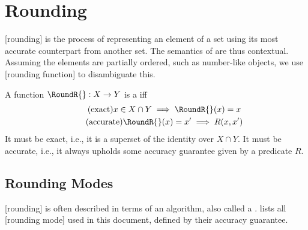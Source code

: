 \section{Rounding}

[rounding] is the process of representing an element of a set using its most accurate counterpart from another set.
The semantics of  are thus contextual.
Assuming the elements are partially ordered, such as number-like objects, we use [rounding function] to disambiguate this.

\begin{definition}
    A function \(\RoundR{} : X \to Y\) is a  iff
    \begin{gather*}
        \label{eq:exact}
        \tag{exact}
        x \in X \cap Y \implies \RoundR{}(x) = x \\
        \label{eq:accurate}
        \tag{accurate}
        \RoundR{}(x) = x^\prime \implies R(x,x^\prime)
    \end{gather*}
    It must be exact, i.e., it is a superset of the identity over \(X \cap Y\).
    It must be accurate, i.e., it always upholds some accuracy guarantee given by a predicate \(R\).
\end{definition}

\subsection{Rounding Modes}

[rounding] is often described in terms of an algorithm, also called a .
 lists all [rounding mode] used in this document, defined by their accuracy guarantee.

